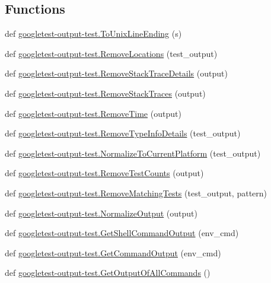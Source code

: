 \subsection*{Functions}
\begin{DoxyCompactItemize}
\item 
def \mbox{\hyperlink{namespacegoogletest-output-test_a5def06b36cb618d010e54bc71b07c36e}{googletest-\/output-\/test.\+To\+Unix\+Line\+Ending}} (s)
\item 
def \mbox{\hyperlink{namespacegoogletest-output-test_a3efeac91fe31d59559f53c5888e64e82}{googletest-\/output-\/test.\+Remove\+Locations}} (test\+\_\+output)
\item 
def \mbox{\hyperlink{namespacegoogletest-output-test_ae092cb89e71f6dd2f9e4c403ee43ee64}{googletest-\/output-\/test.\+Remove\+Stack\+Trace\+Details}} (output)
\item 
def \mbox{\hyperlink{namespacegoogletest-output-test_a15cad04cb1410747f1aeda3d113135fa}{googletest-\/output-\/test.\+Remove\+Stack\+Traces}} (output)
\item 
def \mbox{\hyperlink{namespacegoogletest-output-test_a4f69487747e80f918be30f8fa47ef807}{googletest-\/output-\/test.\+Remove\+Time}} (output)
\item 
def \mbox{\hyperlink{namespacegoogletest-output-test_a1a8d86ab15f4cfbbcbebcfc2c8863421}{googletest-\/output-\/test.\+Remove\+Type\+Info\+Details}} (test\+\_\+output)
\item 
def \mbox{\hyperlink{namespacegoogletest-output-test_a6641ac66a197c6d17b38e5ed3f9bf92e}{googletest-\/output-\/test.\+Normalize\+To\+Current\+Platform}} (test\+\_\+output)
\item 
def \mbox{\hyperlink{namespacegoogletest-output-test_a893f0af4d909d6c3a8d02727e43672c3}{googletest-\/output-\/test.\+Remove\+Test\+Counts}} (output)
\item 
def \mbox{\hyperlink{namespacegoogletest-output-test_a1ddcd0744bceeaaea8097047ee0cb1e6}{googletest-\/output-\/test.\+Remove\+Matching\+Tests}} (test\+\_\+output, pattern)
\item 
def \mbox{\hyperlink{namespacegoogletest-output-test_a34d8f4f0f5714a846af7a576fca906ea}{googletest-\/output-\/test.\+Normalize\+Output}} (output)
\item 
def \mbox{\hyperlink{namespacegoogletest-output-test_aba640d7d1d0c51624f079baff79a04ab}{googletest-\/output-\/test.\+Get\+Shell\+Command\+Output}} (env\+\_\+cmd)
\item 
def \mbox{\hyperlink{namespacegoogletest-output-test_ab1776de1dd70435fb1af39390bd7d4f3}{googletest-\/output-\/test.\+Get\+Command\+Output}} (env\+\_\+cmd)
\item 
def \mbox{\hyperlink{namespacegoogletest-output-test_a3f97b075a05d215e5f7d1c2b71973f78}{googletest-\/output-\/test.\+Get\+Output\+Of\+All\+Commands}} ()
\end{DoxyCompactItemize}
